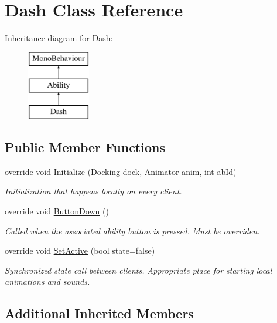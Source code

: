 \hypertarget{class_dash}{}\section{Dash Class Reference}
\label{class_dash}
Inheritance diagram for Dash\+:\begin{figure}[H]
\begin{center}
\leavevmode
\includegraphics[height=3.000000cm]{class_dash}
\end{center}
\end{figure}
\subsection*{Public Member Functions}
\begin{DoxyCompactItemize}
\item 
override void \hyperlink{class_dash_a20f3651241a3bd4b1fd29c00eef4b8f6}{Initialize} (\hyperlink{class_docking}{Docking} dock, Animator anim, int ab\+Id)
\begin{DoxyCompactList}\small\item\em Initialization that happens locally on every client. \end{DoxyCompactList}\item 
override void \hyperlink{class_dash_ac959b32bf45d10a19da6d3ca363a220c}{Button\+Down} ()
\begin{DoxyCompactList}\small\item\em Called when the associated ability button is pressed. Must be overriden. \end{DoxyCompactList}\item 
override void \hyperlink{class_dash_a8eae582cfefa94fe254aeaca07d55674}{Set\+Active} (bool state=false)
\begin{DoxyCompactList}\small\item\em Synchronized state call between clients. Appropriate place for starting local animations and sounds. \end{DoxyCompactList}\end{DoxyCompactItemize}
\subsection*{Additional Inherited Members}


